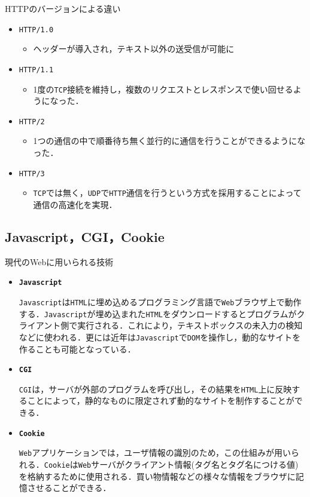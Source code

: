 \documentclass[11pt, aspectratio=169]{beamer}
\begin{document}
\begin{frame}{HTTPのバージョンによる違い}
  \begin{itemize}
    \item \texttt{HTTP/1.0}
      \begin{itemize}
        \item ヘッダーが導入され，テキスト以外の送受信が可能に
      \end{itemize}
    \item \texttt{HTTP/1.1}
      \begin{itemize}
        \item 1度の\texttt{TCP}接続を維持し，複数のリクエストとレスポンスで使い回せるようになった．
      \end{itemize}
    \item \texttt{HTTP/2}
      \begin{itemize}
        \item 1つの通信の中で順番待ち無く並行的に通信を行うことができるようになった．
      \end{itemize}
    \item \texttt{HTTP/3}
      \begin{itemize}
        \item \texttt{TCP}では無く，\texttt{UDP}で\texttt{HTTP}通信を行うという方式を採用することによって通信の高速化を実現．
      \end{itemize}
  \end{itemize}
\end{frame}

\subsection{Javascript，CGI，Cookie}
\begin{frame}{現代のWebに用いられる技術}
  \begin{itemize}
    \item \textbf{\texttt{Javascript}}

      \texttt{Javascript}は\texttt{HTML}に埋め込めるプログラミング言語で\texttt{Web}ブラウザ上で動作する．\texttt{Javascript}が埋め込まれた\texttt{HTML}をダウンロードするとプログラムがクライアント側で実行される．これにより，テキストボックスの未入力の検知などに使われる．更には近年は\texttt{Javascript}で\texttt{DOM}を操作し，動的なサイトを作ることも可能となっている．
      
    \item \textbf{\texttt{CGI}}

      \texttt{CGI}は，サーバが外部のプログラムを呼び出し，その結果を\texttt{HTML}上に反映することによって，静的なものに限定されず動的なサイトを制作することができる．

    \item \textbf{\texttt{Cookie}}

      \texttt{Web}アプリケーションでは，ユーザ情報の識別のため，この仕組みが用いられる．\texttt{Cookie}は\texttt{Web}サーバがクライアント情報(タグ名とタグ名につける値)を格納するために使用される．買い物情報などの様々な情報をブラウザに記憶させることができる．
  \end{itemize}
\end{frame}
\end{document}
